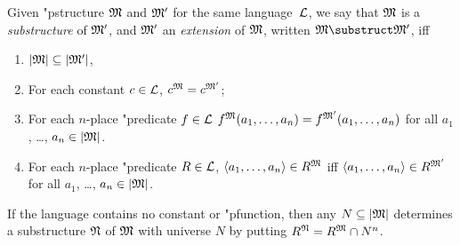 \documentclass[../../include/open-logic-section]{subfiles}
\begin{document}

\begin{defn}
Given "p{structure} $\mathfrak M$ and $\mathfrak M'$ for the same language~$\mathcal L$,
we say that $\mathfrak M$ is a \emph{substructure} of $\mathfrak M'$, and
$\mathfrak M'$ an \emph{extension} of $\mathfrak M$, written $\Struct M
\substruct \Struct M'$, iff
\begin{enumerate}
\item $\left| \mathfrak M \right| \subseteq \left| \mathfrak M' \right|$,
\item For each constant $c \in \mathcal L$, $c^{\mathfrak M} =
    c^{\mathfrak M'}$;
\item For each $n$-place "{predicate} $f \in \mathcal L$
  $f^{\mathfrak M}(a_1, \dots, a_n) = f^{\mathfrak M'}(a_1, \dots, a_n)$
  for all $a_1$, \dots, $a_n \in \left| \mathfrak M \right|$.
\item For each $n$-place "{predicate} $R \in \mathcal L$, $\langle
  a_1, \dots, a_n\rangle \in R^{\mathfrak M}$ iff $\langle a_1, \dots,
  a_n\rangle \in R^{\mathfrak M'}$ for all $a_1$, \dots, $a_n \in
  \left| \mathfrak M \right|$.
\end{enumerate}
\end{defn}

\begin{rem}
If the language contains no constant or "p{function}, then any $N
\subseteq \left| \mathfrak M \right|$ determines a substructure $\mathfrak N$ of
$\mathfrak M$ with universe $N$ by putting $R^{\mathfrak N} =
R^{\mathfrak M} \cap N^n$.
\end{rem}

\end{document}
